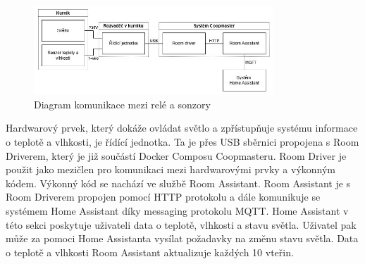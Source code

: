 \begin{figure}[h]
    \centering
    \includegraphics[width=0.8\textwidth]{img/svetlo_teplo_vlhkost}
    \caption{Diagram komunikace mezi relé a sonzory}
    \label{fig:svetlo_teplo_vlhkost}
\end{figure}

Hardwarový prvek, který dokáže ovládat světlo a zpřístupňuje systému informace o teplotě a vlhkosti, je řídící jednotka.
Ta je přes USB sběrnici propojena s Room Driverem, který je již součástí Docker Composu Coopmasteru.
Room Driver je použit jako mezičlen pro komunikaci mezi hardwarovými prvky a výkonným kódem.
Výkonný kód se nachází ve službě Room Assistant.
Room Assistant je s Room Driverem propojen pomocí HTTP protokolu a dále komunikuje se systémem Home Assistant díky messaging protokolu MQTT.
Home Assistant v této sekci poskytuje uživateli data o teplotě, vlhkosti a stavu světla.
Uživatel pak může za pomoci Home Assistanta vysílat požadavky na změnu stavu světla.
Data o teplotě a vlhkosti Room Assistant aktualizuje každých 10 vteřin.


